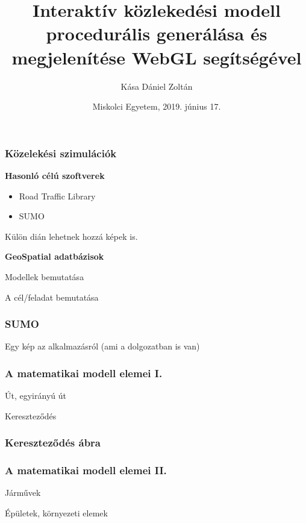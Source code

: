 \documentclass{beamer}
\begin{document}

\title[Interaktív közlekedési modell]{
{\Large Interaktív közlekedési modell procedurális generálása és megjelenítése WebGL segítségével}
}
\author[Kása Dániel Zoltán]{\Large Kása Dániel Zoltán}
\date{Miskolci Egyetem, 2019. június 17.}

\frame{\titlepage}

\begin{frame}[fragile]
\frametitle{Közelekési szimulációk}

\textbf{Hasonló célú szoftverek}

\begin{itemize}
\item Road Traffic Library
\item SUMO
\end{itemize}

Külön dián lehetnek hozzá képek is.

\bigskip

\textbf{GeoSpatial adatbázisok}

Modellek bemutatása

\bigskip

A cél/feladat bemutatása

\end{frame}

\begin{frame}[fragile]
\frametitle{SUMO}

Egy kép az alkalmazásról (ami a dolgozatban is van)

\end{frame}

\begin{frame}[fragile]
\frametitle{A matematikai modell elemei I.}

Út, egyirányú út

Kereszteződés

\end{frame}

\begin{frame}[fragile]
\frametitle{Kereszteződés ábra}


\end{frame}

\begin{frame}[fragile]
\frametitle{A matematikai modell elemei II.}

Járművek

Épületek, környezeti elemek

\end{frame}
\end{document}
